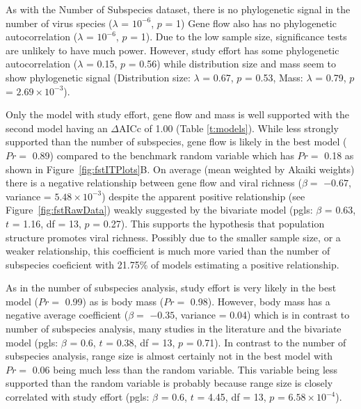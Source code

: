 As with the Number of Subspecies dataset, there is no phylogenetic signal in the number of virus species ($\lambda$ = \ensuremath{10^{-6}}, $p$ = 1)
Gene flow also has no phylogenetic autocorrelation ($\lambda$ = \ensuremath{10^{-6}}, $p$ = 1).
Due to the low sample size, significance tests are unlikely to have much power.
However, study effort has some phylogenetic autocorrelation ($\lambda$ = 0.15, $p$ = 0.56) while distribution size and mass seem to show phylogenetic signal (Distribution size: $\lambda$ = 0.67, $p$ = 0.53, Mass: $\lambda$ = 0.79, $p$ = \ensuremath{2.69\times 10^{-3}}).



Only the model with study effort, gene flow and mass is well supported with the second model having an $\Delta\text{AICc}$ of 1.00 (Table \ref{t:models}).
While less strongly supported than the number of subspecies, gene flow is likely in the best model ($Pr = $ 0.89) compared to the benchmark random variable which has $Pr = $ 0.18 as shown in Figure~\ref{fig:fstITPlots}B.
On average (mean weighted by Akaiki weights) there is a negative relationship between gene flow and viral richness ($\beta = $ \ensuremath{-0.67}, variance = \ensuremath{5.48\times 10^{-3}}) despite the apparent positive relationship (see Figure~\ref{fig:fstRawData}) weakly suggested by the bivariate model (pgls: $\beta$ = 0.63, $t$ = 1.16, df = 13, $p$ = 0.27).
This supports the hypothesis that population structure promotes viral richness.
Possibly due to the smaller sample size, or a weaker relationship, this coefficient is much more varied than the number of subspecies coeficient with 21.75\% of models estimating a positive relationship.

As in the number of subspecies analysis, study effort is very likely in the best model ($Pr = $ 0.99) as is body mass ($Pr = $ 0.98).
However, body mass has a negative average coefficient ($\beta = $ \ensuremath{-0.35}, variance = 0.04) which is in contrast to number of subspecies analysis, many studies in the literature \cite{kamiya2014determines, turmelle2009correlates, gay2014parasite, maganga2014bat} and the bivariate model (pgls: $\beta$ = 0.6, $t$ = 0.38, df = 13, $p$ = 0.71).
In contrast to the number of subspecies analysis, range size is almost certainly not in the best model with $Pr = $ 0.06 being much less than the random variable.
This variable being less supported than the random variable is probably because range size is closely correlated with study effort (pgls: $\beta$ = 0.6, $t$ = 4.45, df = 13, $p$ = \ensuremath{6.58\times 10^{-4}}).

